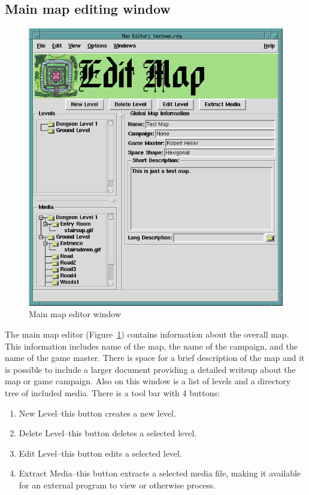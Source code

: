 \subsection{Main map editing window}
\label{sect:mainmap}

\begin{figure}[hbpt] 
\begin{centering}
\includegraphics[width=5in]{MapEditor.png}
\caption{Main map editor window}
\label{fig:MapEditor}
\end{centering}
\end{figure}
The main map editor (Figure~\ref{fig:MapEditor}) contains information
about the overall map.  This information includes name of the map, the
name of the campaign, and the name of the game master.  There is space
for a brief description of the map and it is possible to include a
larger document providing a detailed writeup about the map or game
campaign.  Also on this window is a list of levels and a directory tree
of included media.  There is a tool bar with 4 buttons:

\begin{enumerate}
\item New Level--this button creates a new level.
\item Delete Level--this button deletes a selected level.
\item Edit Level--this button edits a selected level.
\item Extract Media--this button extracts a selected media file, making
it available for an external program to view or otherwise process.
\end{enumerate}


